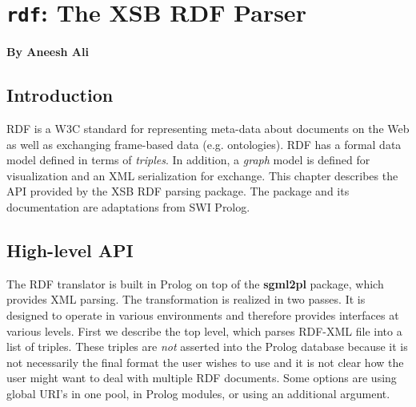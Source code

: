 
\chapter{{\tt rdf}: The XSB RDF Parser}

\begin{center}
  {\Large {\bf By Aneesh Ali}}
\end{center}

\section{Introduction}

RDF is a W3C standard for representing meta-data about documents
on the Web as well as exchanging frame-based data (e.g. ontologies). RDF
has a formal
data model defined in terms of {\it triples}. In addition, a
{\it graph} model is defined for visualization and an XML serialization
for exchange.
This chapter describes the API provided by the XSB RDF parsing package.
The package and its documentation are adaptations
from SWI Prolog.


\section{High-level API}

The RDF translator is built in Prolog on top of the {\bf sgml2pl}
package, which provides XML parsing.
The transformation is realized in two passes.
It is designed to operate in various environments and therefore
provides interfaces at various levels. First we describe the top level,
which parses RDF-XML file into a list of
triples. These triples are {\em not} asserted into the Prolog database
because it is not necessarily the final format the user wishes to use
and it is not clear how the user might want to deal with multiple RDF
documents.  Some options are using global URI's in one pool, in Prolog
modules, or using an additional argument.

